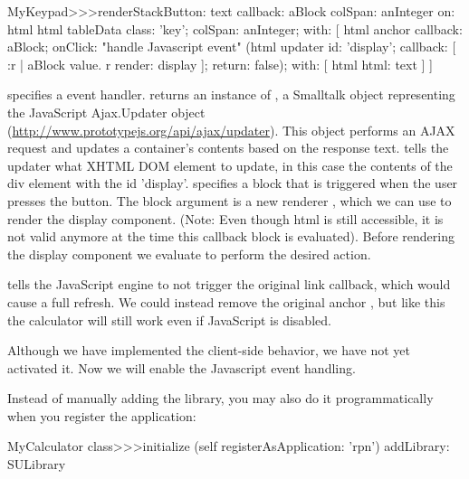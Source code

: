 \documentclass[a4paper,10pt,twoside]{book}
\begin{document}
{{\begin{code}{}
MyKeypad>>>renderStackButton: text callback: aBlock colSpan: anInteger on: html 
	html tableData
		class: 'key';
		colSpan: anInteger;
		with: [
			html anchor
				callback: aBlock;
				onClick:				"handle Javascript event"
					(html updater
						id: 'display';
						callback: [ :r |
							aBlock value.
							r render: display ];
						return: false);
				with: [ html html: text ] ]
\end{code}

 specifies a  event handler.
 returns an instance of , a Smalltalk object representing the JavaScript Ajax.Updater object (\url{http://www.prototypejs.org/api/ajax/updater}).
This object performs an AJAX request and updates a container's contents based on the response text.
 tells the updater what XHTML DOM element to update, in this case the contents of the div element with the id 'display'.
 specifies a block that is triggered when the user presses the button.
The block argument is a new renderer , which we can use to render the display component.
(Note: Even though html is still accessible, it is not valid anymore at the time this callback block is evaluated).
Before rendering the display component we evaluate  to perform the desired action.

 tells the JavaScript engine to not trigger the original link callback, which would cause a full refresh.
We could instead remove the original anchor , but like this the calculator will still work even if JavaScript is disabled.


Although we have implemented the client-side behavior, we have not yet activated it.
Now we will enable the Javascript event handling.


Instead of manually adding the library, you may also do it programmatically when you register the application:
\begin{code}{}
MyCalculator class>>>initialize
	(self registerAsApplication: 'rpn')
		addLibrary: SULibrary
\end{code}

}}
\end{document}
